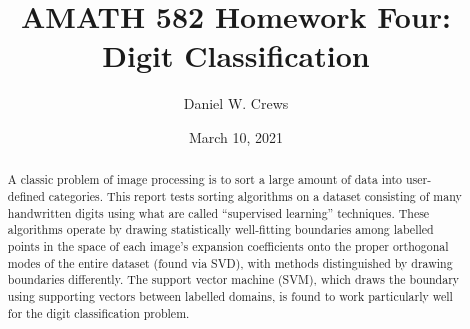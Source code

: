\documentclass{article}
\title{AMATH 582 Homework Four: Digit Classification}
\author{Daniel W. Crews}
\date{March 10, 2021}
\begin{document}
\maketitle

\begin{abstract}
  A classic problem of image processing is to sort a large amount of data into user-defined categories. This report tests sorting algorithms on a dataset consisting of many handwritten digits using what are called ``supervised learning'' techniques. These algorithms operate by drawing statistically well-fitting boundaries among labelled points in the space of each image's expansion coefficients onto the proper orthogonal modes of the entire dataset (found via SVD), with methods distinguished by drawing boundaries differently. The support vector machine (SVM), which draws the boundary using supporting vectors between labelled domains, is found to work particularly well for the digit classification problem.
\end{abstract}
\end{document}
